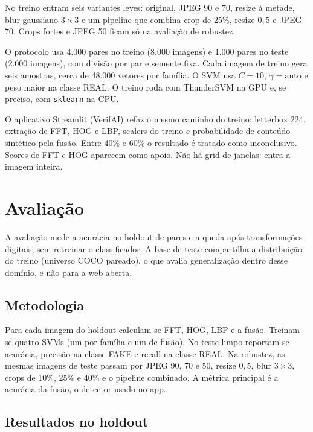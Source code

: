 \documentclass[12pt]{article}
\begin{document}
No treino entram seis variantes leves: original, JPEG 90 e 70, resize à metade, blur gaussiano $3{\times}3$ e um pipeline que combina crop de 25\%, resize $0{,}5$ e JPEG 70. Crops fortes e JPEG 50 ficam só na avaliação de robustez.

O protocolo usa 4{.}000 pares no treino (8{.}000 imagens) e 1{.}000 pares no teste (2{.}000 imagens), com divisão por par e semente fixa. Cada imagem de treino gera seis amostras, cerca de 48{.}000 vetores por família. O SVM usa $C{=}10$, $\gamma{=}\mathrm{auto}$ e peso maior na classe REAL. O treino roda com ThunderSVM na GPU e, se preciso, com \texttt{sklearn} na CPU.

O aplicativo Streamlit (VerifAI) refaz o mesmo caminho do treino: letterbox 224, extração de FFT, HOG e LBP, scalers do treino e probabilidade de conteúdo sintético pela fusão. Entre 40\% e 60\% o resultado é tratado como inconclusivo. Scores de FFT e HOG aparecem como apoio. Não há grid de janelas: entra a imagem inteira.

\section{Avaliação}
\label{sec:avaliacao}

A avaliação mede a acurácia no holdout de pares e a queda após transformações digitais, sem retreinar o classificador. A base de teste compartilha a distribuição do treino (universo COCO pareado), o que avalia generalização dentro desse domínio, e não para a web aberta.

\subsection{Metodologia}

Para cada imagem do holdout calculam-se FFT, HOG, LBP e a fusão. Treinam-se quatro SVMs (um por família e um de fusão). No teste limpo reportam-se acurácia, precisão na classe FAKE e recall na classe REAL. Na robustez, as mesmas imagens de teste passam por JPEG 90, 70 e 50, resize $0{,}5$, blur $3{\times}3$, crops de 10\%, 25\% e 40\% e o pipeline combinado. A métrica principal é a acurácia da fusão, o detector usado no app.

\subsection{Resultados no holdout}
\end{document}
